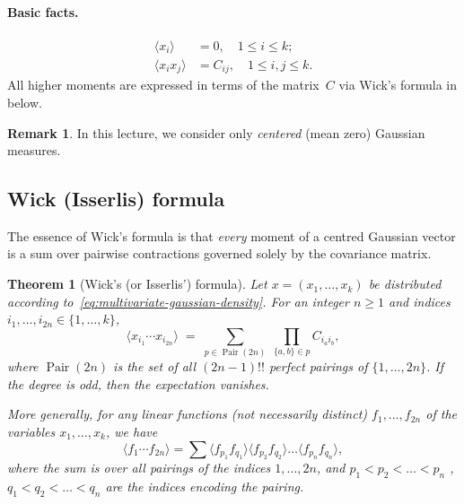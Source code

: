 \documentclass[letterpaper,11pt,oneside,reqno]{article}
\numberwithin{equation}{section}
\newtheorem{theorem}[proposition]{Theorem}
\theoremstyle{definition}
\newtheorem{remark}[proposition]{Remark}
\begin{document}
\paragraph{Basic facts.}
\begin{align}
  \langle x_{i}\rangle &= 0,
  \quad
  1\le i\le k;
  \label{eq:mean-zero}\\
  \langle x_{i}x_{j}\rangle &= C_{ij},
  \quad
  1\le i,j\le k.
  \label{eq:covariance}
\end{align}
All higher moments are expressed in terms of the matrix~$C$
via Wick’s formula in  below.

\begin{remark}
	In this lecture, we consider only \emph{centered} (mean zero) Gaussian measures.
\end{remark}

\subsection{Wick (Isserlis) formula}
\label{subsec:wick}

The essence of Wick’s formula is that \emph{every} moment of a
centred Gaussian vector is a sum over pairwise contractions governed
solely by the covariance matrix.

\begin{theorem}[Wick’s (or Isserlis’) formula]
\label{thm:wick}
Let $x=(x_{1},\dots,x_{k})$ be distributed according
to~\eqref{eq:multivariate-gaussian-density}.
For an integer $n\ge1$ and indices $i_{1},\dots,i_{2n}\in\{1,\dots,k\}$,
\begin{equation}
  \bigl\langle x_{i_{1}}\cdots x_{i_{2n}}\bigr\rangle
  \;=\;
  \sum_{p\in\operatorname{Pair}(2n)}
        \;\prod_{\{a,b\}\in p}
        C_{i_{a}i_{b}},
  \label{eq:wick}
\end{equation}
where $\operatorname{Pair}(2n)$ is the set of all
$(2n-1)!!$ perfect pairings of $\{1,\dots,2n\}$.
If the degree is \emph{odd}, then the expectation vanishes.

More generally, for any \emph{linear} functions (not necessarily distinct)
$f_1,\ldots,f_{2n}$ of the variables $x_1,\ldots,x_k$, we have
\begin{equation}
	\label{eq:f_Wick}
	\bigl\langle f_{1}\cdots f_{2n}\bigr\rangle
	=\sum
	\langle f_{p_1}f_{q_1} \rangle
	\langle f_{p_2}f_{q_2} \rangle \ldots
	\langle f_{p_n}f_{q_n} \rangle,
\end{equation}
where the sum is over all pairings of the indices $1,\ldots,2n$,
and $p_1<p_2<\ldots<p_n$ , $q_1<q_2<\ldots<q_n$ are the
indices encoding the pairing.
\end{theorem}
\end{document}
